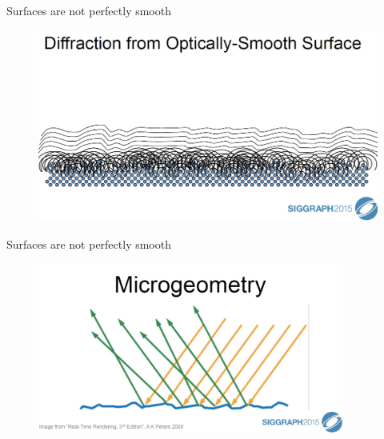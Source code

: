 \documentclass[]{beamer}
\begin{document}
\begin{frame}


    \textcolor{mypink1}{Surfaces are not perfectly smooth }
   

    
    \begin{figure}[h!]
      \begin{center}
        \includegraphics[height=2.5in]{images/8.jpg}
      \end{center}
    \end{figure}
  \end{frame}
    
\begin{frame}


    \textcolor{mypink1}{Surfaces are not perfectly smooth }
   

    
    \begin{figure}[h!]
      \begin{center}
        \includegraphics[height=2.2in]{images/9.jpg}
      \end{center}
    \end{figure}
  \end{frame}
    
\end{document}
